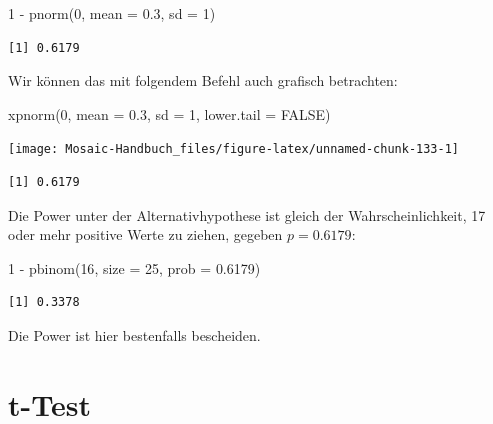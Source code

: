 \documentclass[
  ngerman,
]{scrbook}
\newenvironment{Shaded}{\begin{snugshade}}{\end{snugshade}}
\newcommand{\AttributeTok}[1]{\textcolor[rgb]{0.77,0.63,0.00}{#1}}
\newcommand{\ConstantTok}[1]{\textcolor[rgb]{0.00,0.00,0.00}{#1}}
\newcommand{\DecValTok}[1]{\textcolor[rgb]{0.00,0.00,0.81}{#1}}
\newcommand{\FloatTok}[1]{\textcolor[rgb]{0.00,0.00,0.81}{#1}}
\newcommand{\FunctionTok}[1]{\textcolor[rgb]{0.00,0.00,0.00}{#1}}
\newcommand{\NormalTok}[1]{#1}
\newcommand{\SpecialCharTok}[1]{\textcolor[rgb]{0.00,0.00,0.00}{#1}}
\begin{document}
\begin{Shaded}
\begin{Highlighting}[]
\DecValTok{1} \SpecialCharTok{{-}} \FunctionTok{pnorm}\NormalTok{(}\DecValTok{0}\NormalTok{, }\AttributeTok{mean =} \FloatTok{0.3}\NormalTok{, }\AttributeTok{sd =} \DecValTok{1}\NormalTok{)}
\end{Highlighting}
\end{Shaded}

\begin{verbatim}
[1] 0.6179
\end{verbatim}

Wir können das mit folgendem Befehl auch grafisch betrachten:

\begin{Shaded}
\begin{Highlighting}[]
\FunctionTok{xpnorm}\NormalTok{(}\DecValTok{0}\NormalTok{, }\AttributeTok{mean =} \FloatTok{0.3}\NormalTok{, }\AttributeTok{sd =} \DecValTok{1}\NormalTok{, }\AttributeTok{lower.tail =} \ConstantTok{FALSE}\NormalTok{)}
\end{Highlighting}
\end{Shaded}

\begin{center}\texttt{[image: Mosaic-Handbuch\_files/figure-latex/unnamed-chunk-133-1]} \end{center}

\begin{verbatim}
[1] 0.6179
\end{verbatim}

Die Power unter der Alternativhypothese ist gleich der Wahrscheinlichkeit, 17 oder mehr positive Werte zu ziehen, gegeben \(p = 0.6179\):

\begin{Shaded}
\begin{Highlighting}[]
\DecValTok{1} \SpecialCharTok{{-}} \FunctionTok{pbinom}\NormalTok{(}\DecValTok{16}\NormalTok{, }\AttributeTok{size =} \DecValTok{25}\NormalTok{, }\AttributeTok{prob =} \FloatTok{0.6179}\NormalTok{)}
\end{Highlighting}
\end{Shaded}

\begin{verbatim}
[1] 0.3378
\end{verbatim}

Die Power ist hier bestenfalls bescheiden.

\hypertarget{t-test}{%
\section{t-Test}\label{t-test}}
\end{document}
